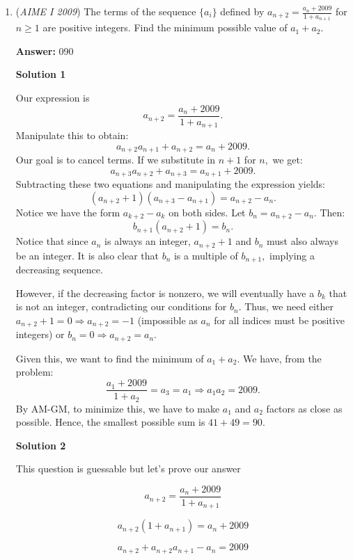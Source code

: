 \begin{enumerate}
 \textbf{Side Note} It can be shown that the value of $\frac83$ does not actually depend on the sides of the triangle. That is, if we do this same construction with any right triangle and compute the ratio, we will get $\frac83$. ~Puck\_0

 


	\item (\textit{AIME I 2009}) The terms of the sequence $\{a_i\}$ defined by $a_{n + 2} = \frac {a_n + 2009} {1 + a_{n + 1}}$ for $n \ge 1$ are positive integers. Find the minimum possible value of $a_1 + a_2$.


 
 \textbf{Answer: }090



\textbf{Solution 1}

Our expression is
 \[a_{n + 2} = \frac {a_n + 2009} {1 + a_{n + 1}}.\]Manipulate this to obtain:
 \[a_{n + 2}a_{n + 1}+a_{n+2}= a_n + 2009.\]Our goal is to cancel terms. If we substitute in $n+1$ for $n,$ we get:
 \[a_{n+3}a_{n+2}+a_{n+3}=a_{n+1}+2009.\]Subtracting these two equations and manipulating the expression yields:
 \[(a_{n+2}+1)(a_{n+3}-a_{n+1})=a_{n+2}-a_n.\]Notice we have the form $a_{k+2}-a_k$ on both sides. Let $b_n=a_{n+2}-a_n.$ Then:
 \[b_{n+1}(a_{n+2}+1)=b_n.\]Notice that since $a_n$ is always an integer, $a_{n+2}+1$ and $b_n$ must also always be an integer. It is also clear that $b_n$ is a multiple of $b_{n+1},$ implying a decreasing sequence.

 However, if the decreasing factor is nonzero, we will eventually have a $b_k$ that is not an integer, contradicting our conditions for $b_n$. Thus, we need either $a_{n+2}+1=0 \Rightarrow a_{n+2}=-1$ (impossible as $a_n$ for all indices must be positive integers) or $b_n=0 \Rightarrow a_{n+2}=a_n.$

 Given this, we want to find the minimum of $a_1+a_2.$ We have, from the problem:
 \[\frac{a_1+2009}{1+a_2}=a_3=a_1 \Rightarrow a_1 a_2 = 2009.\]By AM-GM, to minimize this, we have to make $a_1$ and $a_2$ factors as close as possible. Hence, the smallest possible sum is $41+49=90.$




\textbf{Solution 2}

This question is guessable but let's prove our answer

 
 \[a_{n + 2} = \frac {a_n + 2009} {1 + a_{n + 1}}\]

 \[a_{n + 2}(1 + a_{n + 1})= a_n + 2009\]

 \[a_{n + 2}+a_{n + 2} a_{n + 1}-a_n= 2009\]


\end{enumerate}
